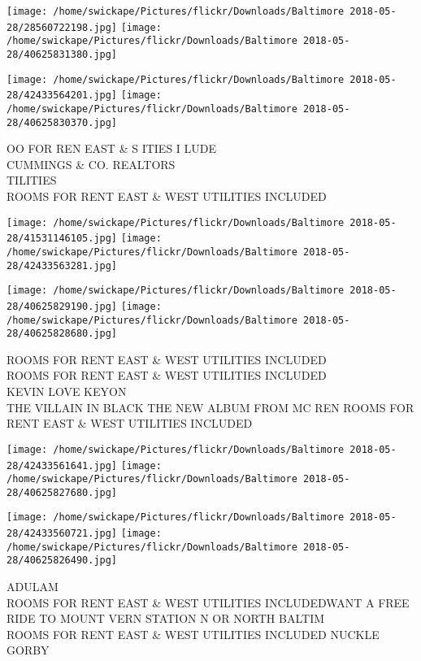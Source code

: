 \documentclass[10pt,letterpaper]{article}
\begin{document}
\texttt{[image: /home/swickape/Pictures/flickr/Downloads/Baltimore 2018-05-28/28560722198.jpg]}
\texttt{[image: /home/swickape/Pictures/flickr/Downloads/Baltimore 2018-05-28/40625831380.jpg]}

\texttt{[image: /home/swickape/Pictures/flickr/Downloads/Baltimore 2018-05-28/42433564201.jpg]}
\texttt{[image: /home/swickape/Pictures/flickr/Downloads/Baltimore 2018-05-28/40625830370.jpg]}

OO FOR REN EAST \& S ITIES I LUDE\\
CUMMINGS \& CO. REALTORS\\
TILITIES\\
ROOMS FOR RENT EAST \& WEST UTILITIES INCLUDED\\
\pagebreak

\texttt{[image: /home/swickape/Pictures/flickr/Downloads/Baltimore 2018-05-28/41531146105.jpg]}
\texttt{[image: /home/swickape/Pictures/flickr/Downloads/Baltimore 2018-05-28/42433563281.jpg]}

\texttt{[image: /home/swickape/Pictures/flickr/Downloads/Baltimore 2018-05-28/40625829190.jpg]}
\texttt{[image: /home/swickape/Pictures/flickr/Downloads/Baltimore 2018-05-28/40625828680.jpg]}

ROOMS FOR RENT EAST \& WEST UTILITIES INCLUDED\\
ROOMS FOR RENT EAST \& WEST UTILITIES INCLUDED\\
KEVIN LOVE KEYON\\
THE VILLAIN IN BLACK THE NEW ALBUM FROM MC REN ROOMS FOR RENT EAST \& WEST UTILITIES INCLUDED\\
\pagebreak

\texttt{[image: /home/swickape/Pictures/flickr/Downloads/Baltimore 2018-05-28/42433561641.jpg]}
\texttt{[image: /home/swickape/Pictures/flickr/Downloads/Baltimore 2018-05-28/40625827680.jpg]}

\texttt{[image: /home/swickape/Pictures/flickr/Downloads/Baltimore 2018-05-28/42433560721.jpg]}
\texttt{[image: /home/swickape/Pictures/flickr/Downloads/Baltimore 2018-05-28/40625826490.jpg]}

ADULAM\\
ROOMS FOR RENT EAST \& WEST UTILITIES INCLUDEDWANT A FREE RIDE TO MOUNT VERN STATION N OR NORTH BALTIM\\
ROOMS FOR RENT EAST \& WEST UTILITIES INCLUDED NUCKLE\\
GORBY\\
\pagebreak
\end{document}

